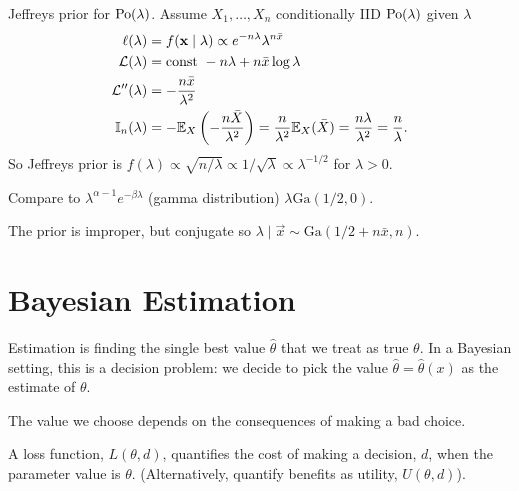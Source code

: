 \documentclass[10pt, a4paper]{article}
\begin{document}
\begin{example}
    Jeffreys prior for $\operatorname{Po}(\lambda)$.
    Assume $X_1, \dotsc, X_n$ conditionally IID $\operatorname{Po}(\lambda)$ given $\lambda$
    \begin{align*}
        \ell(\lambda) &= f(\mathbf{x} \mid \lambda) \propto e ^ {-n\lambda}\lambda ^ {n\bar{x}} \\
        \mathcal{L}(\lambda) &= \text{const } - n\lambda + n\bar{x}\log{\lambda} \\
        \mathcal{L}''(\lambda) &= -\frac{n\bar{x}}{\lambda ^ 2} \\
        \mathbb{I}_n(\lambda) &= -\mathbb{E}_{X}\left(-\frac{n\bar{X}}{\lambda ^ 2}\right) = \frac{n}{\lambda ^ 2}\mathbb{E}_{X}(\bar{X}) = \frac{n\lambda}{\lambda ^ 2} = \frac{n}{\lambda}.
    \end{align*}
    So Jeffreys prior is $f(\lambda) \propto \sqrt{n / \lambda} \propto 1 / \sqrt{\lambda} \propto \lambda ^ {-1 / 2}$ for $\lambda > 0$.

    Compare to $\lambda ^ {\alpha - 1}e ^ {-\beta \lambda}$
    (gamma distribution)
    $\lambda \mathrm{Ga}(1 / 2, 0)$.

    The prior is improper,
    but conjugate so $\lambda \mid \vec{x} \sim \mathrm{Ga}(1 / 2 + n\bar{x}, n)$.
\end{example}

\newpage

\section{Bayesian Estimation}

Estimation is finding the single best value $\hat{\theta}$ that we treat as true $\theta$.
In a Bayesian setting,
this is a decision problem:
we decide to pick the value $\hat{\theta} = \hat{\theta}(x)$ as the estimate of $\theta$.

The value we choose depends on the consequences of making a bad choice.

\begin{definition}
    A loss function,
    $L(\theta, d)$,
    quantifies the cost of making a decision,
    $d$,
    when the parameter value is $\theta$.
    (Alternatively,
    quantify benefits as utility,
    $U(\theta, d)$).
\end{definition}
\end{document}
